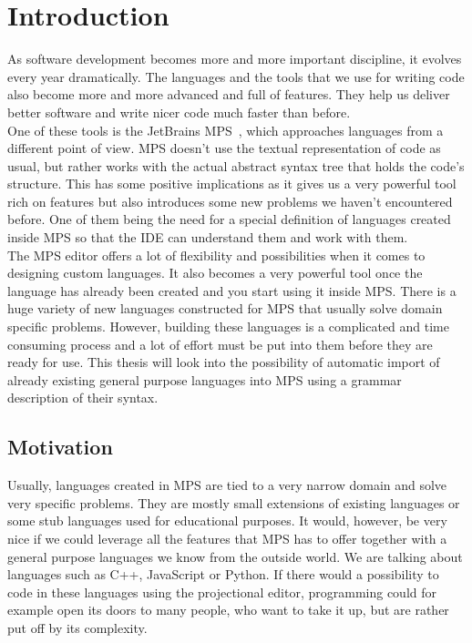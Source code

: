\chapter{Introduction}

As software development becomes more and more important discipline, it evolves every year dramatically. The languages and the tools that we use for writing code also become more and more advanced and full of features. They help us deliver better software and write nicer code much faster than before. 
\\

One of these tools is the JetBrains MPS~\cite{MPS}, which approaches languages from a different point of view. MPS doesn't use the textual representation of code as usual, but rather works with the actual abstract syntax tree that holds the code's structure. This has some positive implications as it gives us a very powerful tool rich on features but also introduces some new problems we haven't encountered before. One of them being the need for a special definition of languages created inside MPS so that the IDE can understand them and work with them.
\\

The MPS editor offers a lot of flexibility and possibilities when it comes to designing custom languages. It also becomes a very powerful tool once the language has already been created and you start using it inside MPS. There is a huge variety of new languages constructed for MPS that usually solve domain specific problems. However, building these languages is a complicated and time consuming process and a lot of effort must be put into them before they are ready for use. This thesis will look into the possibility of automatic import of already existing general purpose languages into MPS using a grammar description of their syntax.

\section{Motivation}

Usually, languages created in MPS are tied to a very narrow domain and solve very specific problems. They are mostly small extensions of existing languages or some stub languages used for educational purposes. It would, however, be very nice if we could leverage all the features that MPS has to offer together with a general purpose languages we know from the outside world. We are talking about languages such as C++, JavaScript or Python. If there would a possibility to code in these languages using the projectional editor, programming could for example open its doors to many people, who want to take it up, but are rather put off by its complexity.
\\

